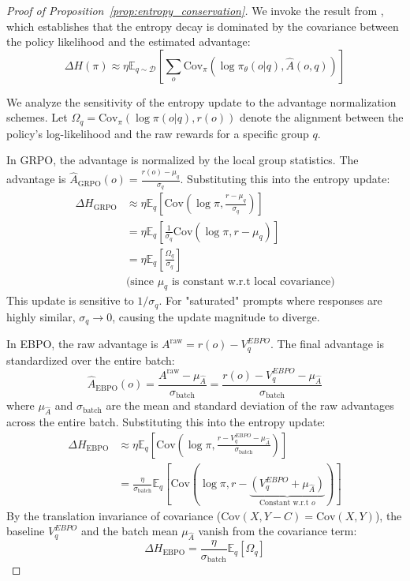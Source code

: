 \documentclass{article}
\theoremstyle{plain}
\theoremstyle{definition}
\theoremstyle{remark}
\begin{document}
\iffalse
\begin{proof}[Proof of Proposition~\ref{prop:entropy_conservation}]
We invoke the result from \citet{cui2025entropy}, which establishes that the entropy decay is dominated by the covariance between the policy likelihood and the estimated advantage:
\begin{equation*}
    \Delta H(\pi) \approx \eta \mathbb{E}_{q \sim \mathcal{D}} \left[ \sum_{o} \text{Cov}_{\pi}\left( \log \pi_\theta(o|q), \hat{A}(o, q) \right) \right]
\end{equation*}

We analyze the sensitivity of the entropy update to the advantage normalization schemes. Let $\Omega_q = \text{Cov}_{\pi}(\log \pi(o|q), r(o))$ denote the alignment between the policy's log-likelihood and the raw rewards for a specific group $q$.

In GRPO, the advantage is normalized by the local group statistics. The advantage is $\hat{A}_{\text{GRPO}}(o) = \frac{r(o) - \mu_q}{\sigma_q}$. Substituting this into the entropy update:
\begin{align*}
    \Delta H_{\text{GRPO}} &\approx \eta \mathbb{E}_{q} \left[ \text{Cov}\left( \log \pi, \frac{r - \mu_q}{\sigma_q} \right) \right] \\
    &= \eta \mathbb{E}_{q} \left[ \frac{1}{\sigma_q} \text{Cov}( \log \pi, r - \mu_q ) \right] \\
    &= \eta \mathbb{E}_{q} \left[ \frac{\Omega_q}{\sigma_q} \right] \\
    & \text{(since $\mu_q$ is constant w.r.t local covariance)}
\end{align*}
This update is sensitive to $1/\sigma_q$. For "saturated" prompts where responses are highly similar, $\sigma_q \to 0$, causing the update magnitude to diverge.

In EBPO, the raw advantage is $A^{\text{raw}} = r(o) - V^{EBPO}_q$. The final advantage is standardized over the entire batch:
\begin{equation*}
    \hat{A}_{\text{EBPO}}(o) = \frac{A^{\text{raw}} - \mu_{\hat{A}}}{\sigma_{\text{batch}}} = \frac{r(o) - V^{EBPO}_q - \mu_{\hat{A}}}{\sigma_{\text{batch}}}
\end{equation*}
where $\mu_{\hat{A}}$ and $\sigma_{\text{batch}}$ are the mean and standard deviation of the raw advantages across the entire batch.
Substituting this into the entropy update:
\begin{align*}
    \Delta H_{\text{EBPO}} &\approx \eta \mathbb{E}_{q} \left[ \text{Cov}\left( \log \pi, \frac{r - V^{EBPO}_q - \mu_{\hat{A}}}{\sigma_{\text{batch}}} \right) \right] \\
    &= \frac{\eta}{\sigma_{\text{batch}}} \mathbb{E}_{q} \left[ \text{Cov}( \log \pi, r - \underbrace{(V^{EBPO}_q + \mu_{\hat{A}})}_{\text{Constant w.r.t } o} ) \right]
\end{align*}
By the translation invariance of covariance ($\text{Cov}(X, Y - C) = \text{Cov}(X, Y)$), the baseline $V^{EBPO}_q$ and the batch mean $\mu_{\hat{A}}$ vanish from the covariance term:
\begin{equation*}
    \Delta H_{\text{EBPO}} = \frac{\eta}{\sigma_{\text{batch}}} \mathbb{E}_{q} [ \Omega_q ]
\end{equation*}


\end{proof}
\end{document}
